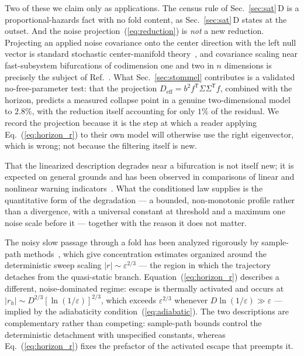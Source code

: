 \documentclass[%
 aip,
 cha,
 amsmath,amssymb,
 reprint,
 superscriptaddress,
 floatfix,
]{revtex4-2}
\begin{document}
Two of these we claim only as applications.  The census rule of Sec.~\ref{sec:sat}\,D is a proportional-hazards fact with no fold content, as Sec.~\ref{sec:sat}\,D states at the outset.  And the noise projection~(\ref{eq:reduction}) is \emph{not} a new reduction.  Projecting an applied noise covariance onto the center direction with the left null vector is standard stochastic center-manifold theory~\cite{Boxler1989,RobertsSCM2008}, and covariance scaling near fast-subsystem bifurcations of codimension one and two in $n$ dimensions is precisely the subject of Ref.~\cite{Kuehn2013}.  What Sec.~\ref{sec:stommel} contributes is a validated no-free-parameter test: that the projection $D_{\mathrm{eff}}=b^2f^{\mathsf T}\Sigma\Sigma^{\mathsf T}f$, combined with the horizon, predicts a measured collapse point in a genuine two-dimensional model to $2.8\%$, with the reduction itself accounting for only $1\%$ of the residual.  We record the projection because it is the step at which a reader applying Eq.~(\ref{eq:horizon_r}) to their own model will otherwise use the right eigenvector, which is wrong; not because the filtering itself is new.

That the linearized description degrades near a bifurcation is not itself new; it is expected on general grounds and has been observed in comparisons of linear and nonlinear warning indicators~\cite{Kuehn2011,Dakos2024}.  What the conditioned law supplies is the quantitative form of the degradation --- a bounded, non-monotonic profile rather than a divergence, with a universal constant at threshold and a maximum one noise scale before it --- together with the reason it does not matter.

The noisy slow passage through a fold has been analyzed rigorously by sample-path methods~\cite{BerglundGentz2006}, which give concentration estimates organized around the deterministic sweep scaling $|r|\sim\varepsilon^{2/3}$ --- the region in which the trajectory detaches from the quasi-static branch.  Equation~(\ref{eq:horizon_r}) describes a different, noise-dominated regime: escape is thermally activated and occurs at $|r_h|\sim D^{2/3}[\ln(1/\varepsilon)]^{2/3}$, which exceeds $\varepsilon^{2/3}$ whenever $D\ln(1/\varepsilon)\gg\varepsilon$ --- implied by the adiabaticity condition~(\ref{eq:adiabatic}).  The two descriptions are complementary rather than competing: sample-path bounds control the deterministic detachment with unspecified constants, whereas Eq.~(\ref{eq:horizon_r}) fixes the prefactor of the activated escape that preempts it.
\end{document}
